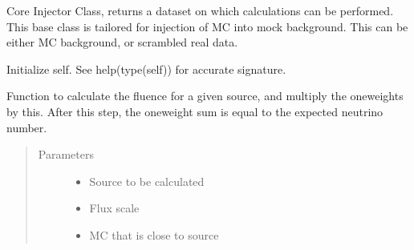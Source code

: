\documentclass[letterpaper,10pt,english]{sphinxmanual}
\begin{document}
\begin{fulllineitems}
\label{\detokenize{index:flarestack.core.injector.MCInjector}}
Core Injector Class, returns a dataset on which calculations can be
performed. This base class is tailored for injection of MC into mock
background. This can be either MC background, or scrambled real data.

\begin{fulllineitems}
\label{\detokenize{index:flarestack.core.injector.MCInjector.__init__}}
Initialize self.  See help(type(self)) for accurate signature.

\end{fulllineitems}


\begin{fulllineitems}
\label{\detokenize{index:flarestack.core.injector.MCInjector.calculate_fluence}}
Function to calculate the fluence for a given source, and multiply
the oneweights by this. After this step, the oneweight sum is equal
to the expected neutrino number.
\begin{quote}\begin{description}
\item[{Parameters}] \leavevmode\begin{itemize}
\item {} 
 \textendash{} Source to be calculated

\item {} 
 \textendash{} Flux scale

\item {} 
 \textendash{} MC that is close to source


\end{itemize}
\end{description}
\end{quote}
\end{fulllineitems}
\end{fulllineitems}
\end{document}

